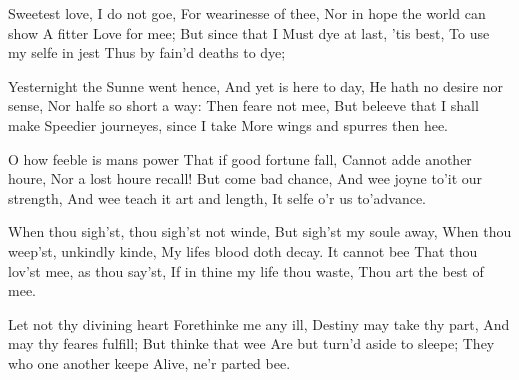 \documentclass{book}
\newenvironment{poem}[1]%
  {\poemtitle{#1}%
   \Versus
   \numerus{1}%
  }
  {\endVersus}
\begin{document}
\begin{poem}{Song\addfirstline}  %
\Forma {}
      
  Sweetest love, I do not goe,        
    For wearinesse of thee,        
  Nor in hope the world can show    \auto       
    A fitter Love for mee;        
      But since that I       
  Must dye at last, 'tis best,        
  To use my selfe in jest        
    Thus by fain'd deaths to dye;        
       
  Yesternight the Sunne went hence,        
    And yet is here to day,       
  He hath no desire nor sense,        
    Nor halfe so short a way:        
      Then feare not mee,        
  But beleeve that I shall make        
  Speedier journeyes, since I take       
    More wings and spurres then hee.        
       
  O how feeble is mans power        
    That if good fortune fall,        
  Cannot adde another houre,        
    Nor a lost houre recall!       
      But come bad chance,        
  And wee joyne to'it our strength,        
  And wee teach it art and length,        
    It selfe o'r us to'advance.        
       
  When thou sigh'st, thou sigh'st not winde,       
    But sigh'st my soule away,        
  When thou weep'st, unkindly kinde,        
    My lifes blood doth decay.        
      It cannot bee        
  That thou lov'st mee, as thou say'st,       
  If in thine my life thou waste,        
    Thou art the best of mee.        
       
  Let not thy divining heart        
    Forethinke me any ill,        
  Destiny may take thy part,       
    And may thy feares fulfill;        
      But thinke that wee        
  Are but turn'd aside to sleepe;        
  They who one another keepe        
    Alive, ne'r parted bee.       
\end{poem}
      
\end{document}
